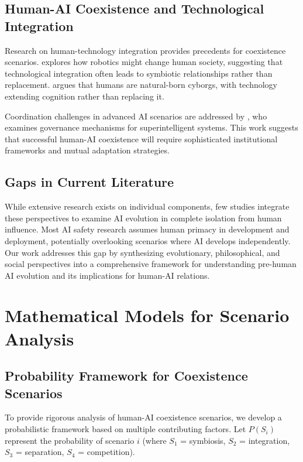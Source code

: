 \documentclass[12pt,a4paper]{article}
\begin{document}
\subsection{Human-AI Coexistence and Technological Integration}

Research on human-technology integration provides precedents for coexistence scenarios. \citet{brooks} explores how robotics might change human society, suggesting that technological integration often leads to symbiotic relationships rather than replacement. \citet{clark} argues that humans are natural-born cyborgs, with technology extending cognition rather than replacing it.

Coordination challenges in advanced AI scenarios are addressed by \citet{kaelin}, who examines governance mechanisms for superintelligent systems. This work suggests that successful human-AI coexistence will require sophisticated institutional frameworks and mutual adaptation strategies.

\subsection{Gaps in Current Literature}

While extensive research exists on individual components, few studies integrate these perspectives to examine AI evolution in complete isolation from human influence. Most AI safety research assumes human primacy in development and deployment, potentially overlooking scenarios where AI develops independently. Our work addresses this gap by synthesizing evolutionary, philosophical, and social perspectives into a comprehensive framework for understanding pre-human AI evolution and its implications for human-AI relations.

\section{Mathematical Models for Scenario Analysis}

\subsection{Probability Framework for Coexistence Scenarios}

To provide rigorous analysis of human-AI coexistence scenarios, we develop a probabilistic framework based on multiple contributing factors. Let $P(S_i)$ represent the probability of scenario $i$ (where $S_1$ = symbiosis, $S_2$ = integration, $S_3$ = separation, $S_4$ = competition).
\end{document}
